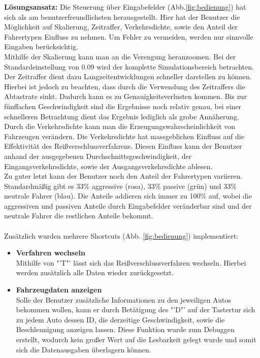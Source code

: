 \begin{addmargin}[25pt]{0pt}
	\item \textbf{Lösungsansatz:} Die Steuerung über Eingabefelder (Abb.\ref{fig:bedienung}) hat sich als am benutzerfreundlichsten herausgestellt. Hier hat der Benutzer die Möglichkeit auf Skalierung, Zeitraffer, Verkehrsdichte, sowie den Anteil der Fahrertypen Einfluss zu nehmen. Um Fehler zu vermeiden, werden nur sinnvolle Eingaben berücksichtig.\\ 
Mithilfe der Skalierung kann man an die Verengung heranzoomen. Bei der Standardeinstellung von 0.09 wird der komplette Simulationsbereich betrachten.\\ 
Der Zeitraffer dient dazu Langzeitentwicklungen schneller darstellen zu können. Hierbei ist jedoch zu beachten, dass durch die Verwendung des Zeitraffers die Abtastrate sinkt. Dadurch kann es zu Genauigkeitsverlusten kommen. Bis zur fünffachen Geschwindigkeit sind die Ergebnisse noch relativ genau, bei einer schnelleren Betrachtung dient das Ergebnis lediglich als grobe Annäherung.\\
Durch die Verkehrsdichte kann man die Erzeugungswahrscheinlichkeit von Fahrzeugen verändern. Die Verkehrsdichte hat massgeblichen Einfluss auf die Effektivität des Reißverschlussverfahrens. Diesen Einfluss kann der Benutzer anhand der ausgegebenen Durchschnittsgeschwindigkeit, der Eingangsverkehrsdichte, sowie der Ausgangsverkehrsdichte ablesen.\\
Zu guter letzt kann der Benutzer noch den Anteil der Fahrertypen variieren. Standardmäßig gibt es 33\% aggressive (rosa), 33\% passive (grün) und 33\% neutrale Fahrer (blau). Die Anteile addieren sich immer zu 100\% auf, wobei die aggressiven und passiven Anteile durch Eingabefelder veränderbar sind und der neutrale Fahrer die restlichen Anteile bekommt.\\\\
	Zusätzlich wurden mehrere Shortcuts (Abb. \ref{fig:bedienung}) implementiert:
	\begin{itemize}
		\item \textbf{Verfahren wechseln}\\
		Mithilfe von "'T"' lässt sich das Reißverschlussverfahren wechseln. Hierbei werden zusätzlich alle Daten wieder zurückgesetzt.
		\item \textbf{Fahrzeugdaten anzeigen}\\
		Solle der Benutzer zusätzliche Informationen zu den jeweiligen Autos bekommen wollen, kann er durch Betätigung des "'D"' auf der Tastertur sich zu jedem Auto dessen ID, die derzeitige Geschwindigkeit, sowie die Beschleunigung anzeigen lassen. Diese Funktion wurde zum Debuggen erstellt, wodurch kein großer Wert auf die Lesbarkeit gelegt wurde und somit sich die Datenausgaben überlagern können.

\end{itemize}
\end{addmargin}
